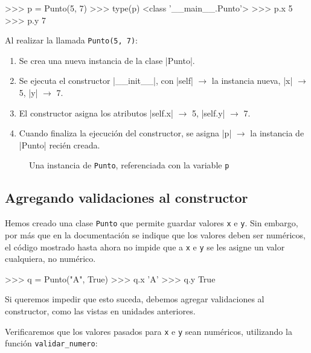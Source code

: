 \begin{codigo-python-sn}
>>> p = Punto(5, 7)
>>> type(p)
<class '__main__.Punto'>
>>> p.x
5
>>> p.y
7
\end{codigo-python-sn}

Al realizar la llamada \lstinline!Punto(5, 7)!:

\begin{enumerate}
\item Se crea una nueva instancia de la clase |Punto|.
\item Se ejecuta el constructor |__init__|, con |self| $\rightarrow$ la
    instancia nueva, |x| $\rightarrow$ 5, |y| $\rightarrow$ 7.
\item El constructor asigna los atributos |self.x| $\rightarrow$ 5, |self.y|
    $\rightarrow$ 7.
\item Cuando finaliza la ejecución del constructor, se asigna |p| $\rightarrow$
    la instancia de |Punto| recién creada.
\end{enumerate}

\begin{figure}[htb]
\caption{Una instancia de \texttt{Punto}, referenciada con la variable \texttt{p}}
\end{figure}
\subsection{Agregando validaciones al constructor}

Hemos creado una clase \lstinline!Punto! que permite guardar valores
\lstinline!x! e \lstinline!y!.  Sin embargo, por más que en la
documentación se indique que los valores deben ser numéricos, el código
mostrado hasta ahora no impide que a \lstinline!x! e \lstinline!y! se les
asigne un valor cualquiera, no numérico.

\begin{codigo-python-sn}
>>> q = Punto("A", True)
>>> q.x
'A'
>>> q.y
True
\end{codigo-python-sn}

Si queremos impedir que esto suceda, debemos agregar validaciones al
constructor, como las vistas en unidades anteriores.

Verificaremos que los valores pasados para \lstinline!x! e \lstinline!y!
sean numéricos, utilizando la función \lstinline!validar_numero!:

